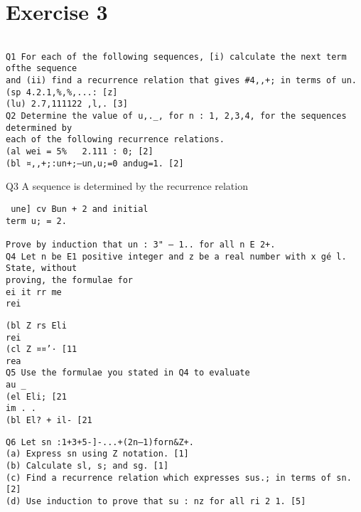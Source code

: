 \documentclass[]{article}
\begin{document}
\section{Exercise 3}
\begin{verbatim}

Q1 For each of the following sequences, [i) calculate the next term ofthe sequence
and (ii) find a recurrence relation that gives #4,,+; in terms of un.
(sp 4.2.1,%,%,...: [z]
(lu) 2.7,111122 ,l,. [3]
Q2 Determine the value of u,._, for n : 1, 2,3,4, for the sequences determined by
each of the following recurrence relations.
(al wei = 5%   2.111 : 0; [2]
(bl ¤,,+;:un+;—un,u;=0 andug=1. [2]
\end{verbatim}
Q3 A sequence is determined by the recurrence relation
\begin{verbatim}
 une] cv Bun + 2 and initial
term u; = 2. 

Prove by induction that un : 3" — 1.. for all n E 2+.  
Q4 Let n be E1 positive integer and z be a real number with x gé l. State, without
proving, the formulae for
ei it rr me
rei
 \end{verbatim}
 \begin{verbatim}
(bl Z rs Eli
rei
(cl Z ¤¤’· [11
rea
Q5 Use the formulae you stated in Q4 to evaluate
au _
(el Eli; [21
im . .
(bl El? + il- [21
\end{verbatim}
\begin{verbatim}
Q6 Let sn :1+3+5-]-...+(2n—1)forn&Z+.
(a) Express sn using Z notation. [1]
(b) Calculate sl, s; and sg. [1]
(c) Find a recurrence relation which expresses sus.; in terms of sn. [2]
(d) Use induction to prove that su : nz for all ri 2 1. [5]
\end{verbatim}
\end{document}
